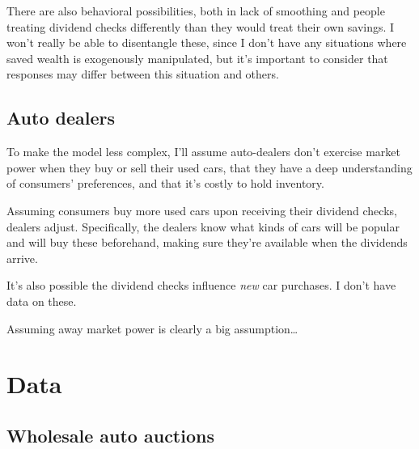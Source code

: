 \documentclass[11pt,letterpaper,oneside]{article}
\begin{document}
There are also behavioral possibilities, both in lack of smoothing and people treating dividend checks differently than they would treat their own savings.
I won't really be able to disentangle these, since I don't have any situations where saved wealth is exogenously manipulated, but it's important to consider that responses may differ between this situation and others.

\subsection{Auto dealers}

To make the model less complex, I'll assume auto-dealers don't exercise market power when they buy or sell their used cars, that they have a deep understanding of consumers' preferences, and that it's costly to hold inventory.

Assuming consumers buy more used cars upon receiving their dividend checks, dealers adjust.
Specifically, the dealers know what kinds of cars will be popular and will buy these beforehand, making sure they're available when the dividends arrive.

It's also possible the dividend checks influence \emph{new} car purchases.
I don't have data on these.

Assuming away market power is clearly a big assumption\ldots


\section{Data}

\subsection{Wholesale auto auctions}
\label{sec:manheim-data}
\end{document}
